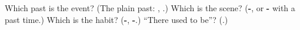 \begin{tcolorbox}[breakable,colback=teal!4,colframe=teal!35!black,title={Before you move on}]
Which past is the event? (The plain past: \textbf{}, \textbf{}.) Which is the scene? (\textbf{-}, or \textbf{-} with a past time.) Which is the habit? (\textbf{-}, \textbf{-}.) \textquotedblleft{}There used to be\textquotedblright{}? (\textbf{}.)
\end{tcolorbox}
